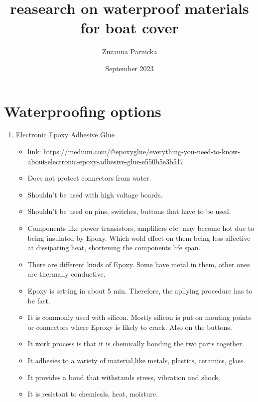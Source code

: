 \documentclass{article}[10pt]
\title{reasearch on waterproof materials for boat cover}
\author{Zuzanna Parnicka}
\date{September 2023}
\begin{document}
\renewcommand{\labelenumii}{\arabic{enumi}.\arabic{enumii}}
\renewcommand{\labelenumiii}{\arabic{enumi}.\arabic{enumii}.\arabic{enumiii}}
\renewcommand{\labelenumiv}{\arabic{enumi}.\arabic{enumii}.\arabic{enumiii}.\arabic{enumiv}}

\maketitle
\section{Waterproofing options}

\begin{enumerate}
    \item Electronic Epoxy Adhesive Glue
          \begin{itemize}
              \item link: \url{https://medium.com/@epoxyglue/everything-you-need-to-know-about-electronic-epoxy-adhesive-glue-e550b5e3b517}
              \item Does not protect connectors from water.
              \item Shouldn't be used with high voltage boards.
              \item Shouldn't be used on pins, switches, buttons that have to be used.
              \item Components like power transistors, amplifiers etc. may become hot due to being insulated by Epoxy. Which wold effect on them being less affective at dissipating heat, shortening the components life span.
              \item There are different kinds of Epoxy. Some have metal in them, other ones are thermally conductive.
              \item Epoxy is setting in about 5 min. Therefore, the apllying procedure has to be fast.
              \item It is commonly used with silicon. Mostly silicon is put on mouting points or connectors where Eproxy is likely to crack. Also on the buttons.
              \item It work process is that it is chemically bonding the two parts together.
              \item It adhesies to a variety of material,like metals, plastics, ceramics, glass.
              \item It provides a bond that withstands stress, vibration and shock.
              \item It is resistant to chemicals, heat, moisture.

\end{itemize}
\end{enumerate}
\end{document}
